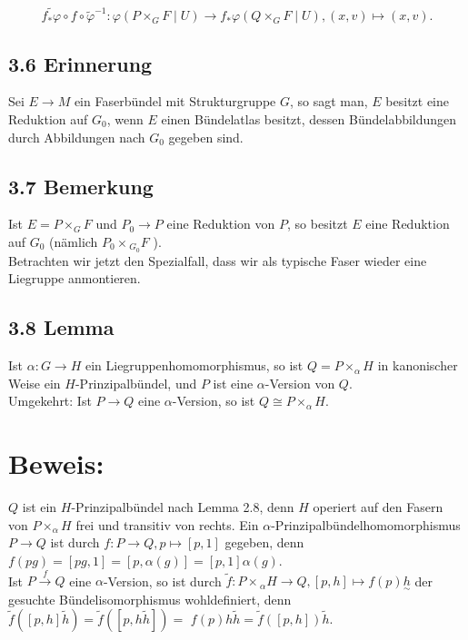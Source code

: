 $$
\widetilde{f_{*} \varphi} \circ f \circ \tilde{\varphi}^{-1}: \varphi\left(P \times_{G} F \mid U\right) \rightarrow f_{*} \varphi\left(Q \times_{G} F \mid U\right),(x, v) \mapsto(x, v) .
$$

\subsection*{3.6 Erinnerung}
Sei $E \rightarrow M$ ein Faserbündel mit Strukturgruppe $G$, so sagt man, $E$ besitzt eine Reduktion auf $G_{0}$, wenn $E$ einen Bündelatlas besitzt, dessen Bündelabbildungen durch Abbildungen nach $G_{0}$ gegeben sind.

\subsection*{3.7 Bemerkung}
Ist $E=P \times_{G} F$ und $P_{0} \rightarrow P$ eine Reduktion von $P$, so besitzt $E$ eine Reduktion auf $G_{0}$ (nämlich $P_{0} \times{ }_{G_{0}} F$ ).\\
Betrachten wir jetzt den Spezialfall, dass wir als typische Faser wieder eine Liegruppe anmontieren.

\subsection*{3.8 Lemma}
Ist $\alpha: G \rightarrow H$ ein Liegruppenhomomorphismus, so ist $Q=P \times_{\alpha} H$ in kanonischer Weise ein $H$-Prinzipalbündel, und $P$ ist eine $\alpha$-Version von $Q$.\\
Umgekehrt: Ist $P \rightarrow Q$ eine $\alpha$-Version, so ist $Q \cong P \times_{\alpha} H$.

\section*{Beweis:}
$Q$ ist ein $H$-Prinzipalbündel nach Lemma 2.8, denn $H$ operiert auf den Fasern von $P \times_{\alpha} H$ frei und transitiv von rechts. Ein $\alpha$-Prinzipalbündelhomomorphismus $P \rightarrow Q$ ist durch $f: P \rightarrow Q, p \mapsto[p, 1]$ gegeben, denn $f(p g)=[p g, 1]=[p, \alpha(g)]=[p, 1] \alpha(g)$.\\
Ist $P \xrightarrow{f} Q$ eine $\alpha$-Version, so ist durch $\tilde{f}: P \times{ }_{\alpha} H \rightarrow Q,[p, h] \mapsto f(p) \underset{\sim}{h}$ der gesuchte Bündelisomorphismus wohldefiniert, denn $\tilde{f}([p, h] \tilde{h})=\tilde{f}([p, h \tilde{h}])=$ $f(p) h \tilde{h}=\tilde{f}([p, h]) \tilde{h}$.


